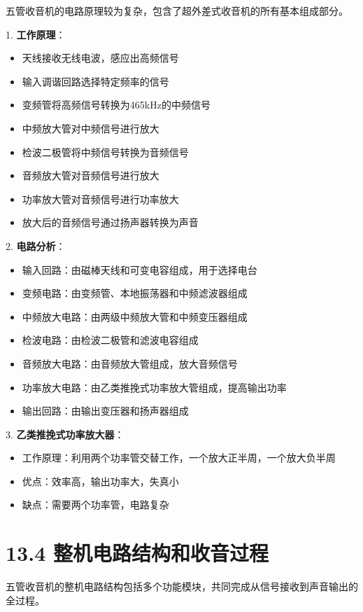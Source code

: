 \documentclass[12pt,UTF8]{ctexbook}
\begin{document}
五管收音机的电路原理较为复杂，包含了超外差式收音机的所有基本组成部分。

1. \textbf{工作原理}：
   \begin{itemize}[leftmargin=3.5em]
   \item 天线接收无线电波，感应出高频信号
   \item 输入调谐回路选择特定频率的信号
   \item 变频管将高频信号转换为465kHz的中频信号
   \item 中频放大管对中频信号进行放大
   \item 检波二极管将中频信号转换为音频信号
   \item 音频放大管对音频信号进行放大
   \item 功率放大管对音频信号进行功率放大
   \item 放大后的音频信号通过扬声器转换为声音
   \end{itemize}

2. \textbf{电路分析}：
   \begin{itemize}[leftmargin=3.5em]
   \item 输入回路：由磁棒天线和可变电容组成，用于选择电台
   \item 变频电路：由变频管、本地振荡器和中频滤波器组成
   \item 中频放大电路：由两级中频放大管和中频变压器组成
   \item 检波电路：由检波二极管和滤波电容组成
   \item 音频放大电路：由音频放大管组成，放大音频信号
   \item 功率放大电路：由乙类推挽式功率放大管组成，提高输出功率
   \item 输出回路：由输出变压器和扬声器组成
   \end{itemize}

3. \textbf{乙类推挽式功率放大器}：
   \begin{itemize}[leftmargin=3.5em]
   \item 工作原理：利用两个功率管交替工作，一个放大正半周，一个放大负半周
   \item 优点：效率高，输出功率大，失真小
   \item 缺点：需要两个功率管，电路复杂
   \end{itemize}

\section*{13.4 整机电路结构和收音过程}

五管收音机的整机电路结构包括多个功能模块，共同完成从信号接收到声音输出的全过程。
\end{document}
